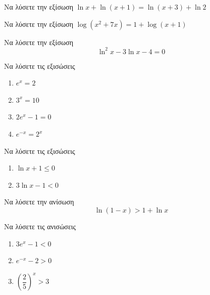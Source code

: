 \documentclass[greek]{beamer}
\begin{document}
\begin{askisi}
  Να λύσετε την εξίσωση $\ln x+\ln (x+1)=\ln (x+3)+\ln 2$


\end{askisi}

\begin{askisi}
  Να λύσετε την εξίσωση $\log (x^2+7x)=1+\log (x+1)$


\end{askisi}

\begin{askisi}
  Να λύσετε την εξίσωση $$\ln^2x-3\ln x-4=0$$


\end{askisi}

\begin{askisi}
  Να λύσετε τις εξισώσεις
  \begin{enumerate}
    \item<1-> $e^x=2$
    \item<2-> $3^x=10$
    \item<3-> $2e^x-1=0$
    \item<4-> $e^{-x}=2^x$
  \end{enumerate}


\end{askisi}

\begin{askisi}
  Να λύσετε τις εξισώσεις
  \begin{enumerate}
    \item<1-> $\ln x+1\le 0$
    \item<2-> $3\ln x-1<0$
  \end{enumerate}


\end{askisi}

\begin{askisi}
  Να λύσετε την ανίσωση $$\ln (1-x)>1+\ln x$$


\end{askisi}

\begin{askisi}
  Να λύσετε τις ανισώσεις
  \begin{enumerate}
    \item<1-> $3e^x-1<0$
    \item<2-> $e^{-x}-2>0$
    \item<3-> $\left( \dfrac{2}{5} \right)^x>3 $
  \end{enumerate}


\end{askisi}
\end{document}
